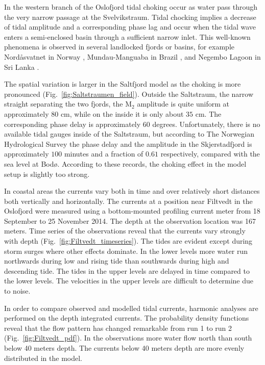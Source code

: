 In the western branch of the Oslofjord tidal choking occur as water pass through the very narrow passage at the Svelvikstraum. Tidal chocking implies a decrease of tidal amplitude and a corresponding phase lag \cite[]{stigebrandt80} and occur when the tidal wave enters a semi-enclosed basin through a sufficient narrow inlet. This well-known phenomena is observed in several landlocked fjords or basins, for example Nord{\aa}svatnet in Norway \cite[]{glenne63}, Mundau-Manguaba in Brazil \cite[]{oliveira93}, and Negembo Lagoon in Sri Lanka \cite[]{rydberg96}. 

The spatial variation is larger in the Saltfjord model as the choking is more pronounced (Fig.~\ref{fig:Saltstraumen_field}). Outside the Saltstraum, the narrow straight separating the two fjords, the M$_2$ amplitude is quite uniform at approximately $80$ cm, while on the inside it is only about $35$ cm. The corresponding phase delay is approximately $60$ degrees. Unfortunately, there is no available tidal gauges inside of the Saltstraum, but according to The Norwegian Hydrological Survey the phase delay and the amplitude in the Skjerstadfjord is approximately $100$ minutes and a fraction of $0.61$ respectively, compared with the sea level at Bod{\o}.
According to these records, the choking effect in the model setup is slightly too strong.

In coastal areas the currents vary both in time and over relatively short distances both vertically and horizontally. The currents at a position near Filtvedt in the Oslofjord were measured using a bottom-mounted profiling current meter from 18 September to 25 November 2014. The depth at the observation location was 167 meters. Time series of the observations reveal that the currents vary strongly with depth (Fig.~\ref{fig:Filtvedt_timeseries}). The tides are evident except during storm surges where other effects dominate. In the lower levels more water run northwards during low and rising tide than southwards during high and descending tide. The tides in the upper levels are delayed in time compared to the lower levels. The velocities in the upper levels are difficult to determine due to noise. 

In order to compare observed and modelled tidal currents, harmonic analyses are performed on the depth integrated currents. The  probability density functions reveal that the flow pattern has changed remarkable from run 1 to run 2 (Fig.~\ref{fig:Filtvedt_pdf}). In the observations more water flow north than south below 40 meters depth. The currents below 40 meters depth are more evenly distributed in the model.  

